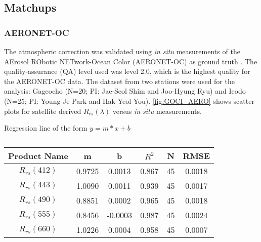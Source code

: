 \documentclass[onecolumn,3p,letterpaper,11pt]{elsarticle}
\begin{document}
\subsection{Matchups}
\subsubsection{AERONET-OC}
The atmospheric correction was validated using {\it in situ} measurements of the AErosol RObotic NETwork-Ocean Color (AERONET-OC) as ground truth \citep{Zibordi2009}. The quality-assurance (QA) level used was level 2.0, which is the highest quality for the AERONET-OC data. The dataset from two stations were used for the analysis: Gageocho (N=20; PI: Jae-Seol Shim and Joo-Hyung Ryu) and Ieodo (N=25; PI: Young-Je Park and Hak-Yeol You). \autoref{fig:GOCI_AERO} shows scatter plots for satellite derived $R_{rs}(\lambda)$ versus {\it in situ} measurements. 

\begin{table}[htbp!]
\caption{Regression line of the form $y=m*x+b$}
\caption{ \label{tab:val_stats} } 
\small
\centering
\begin{tabular}{cccccc} 
 \bfseries{Product Name} & \bfseries{m} & \bfseries{b} & \bfseries{$R^2$} & \bfseries{N} & \bfseries{RMSE} \\ \hline \hline

$R_{rs}(412)$ & 0.9725 &  0.0013 & 0.867 & 45 & 0.0018 \\ 
$R_{rs}(443)$ & 1.0090 &  0.0011 & 0.939 & 45 & 0.0017 \\ 
$R_{rs}(490)$ & 0.8851 &  0.0002 & 0.965 & 45 & 0.0018 \\ 
$R_{rs}(555)$ & 0.8456 & -0.0003 & 0.987 & 45 & 0.0024 \\ 
$R_{rs}(660)$ & 1.0226 &  0.0004 & 0.958 & 45 & 0.0007 \\ 
 \end{tabular}
\end{table}
\end{document}
